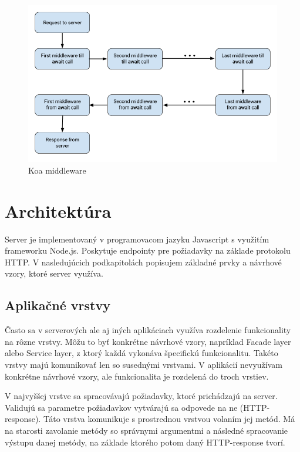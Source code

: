 \documentclass[
  digital, %
  table,   %
  lof,     %
  lot,     %
]{fithesis3}
\begin{document}
\begin{figure}
	\begin{center}
	\includegraphics[width=\textwidth]{img/koa-middleware.png}
	\end{center}
    \caption{Koa middleware}
	\label{fig:koa-middleware}
\end{figure}


\section{Architektúra}
Server je implementovaný v programovacom jazyku Javascript s využitím frameworku Node.js. Poskytuje endpointy pre požiadavky na základe protokolu HTTP. V nasledujúcich podkapitolách popisujem základné prvky a návrhové vzory, ktoré server využíva.

\subsection{Aplikačné vrstvy}
Často sa v serverových ale aj iných aplikáciach využíva rozdelenie funkcionality na rôzne vrstvy. Môžu to byť konkrétne návrhové vzory, napríklad Facade layer alebo Service layer, z ktorý každá vykonáva špecifickú funkcionalitu. Takéto vrstvy majú komunikovať len so susednými vrstvami. V aplikácií nevyužívam konkrétne návrhové vzory, ale funkcionalita je rozdelená do troch vrstiev.

V najvyššej vrstve sa spracovávajú požiadavky, ktoré prichádzajú na server. Validujú sa parametre požiadavkov vytvárajú sa odpovede na ne (HTTP-response). Táto vrstva komunikuje s prostrednou vrstvou volaním jej metód. Má na starosti zavolanie metódy so správnymi argumentmi a následné spracovanie výstupu danej metódy, na základe ktorého potom daný HTTP-response tvorí.
\end{document}
